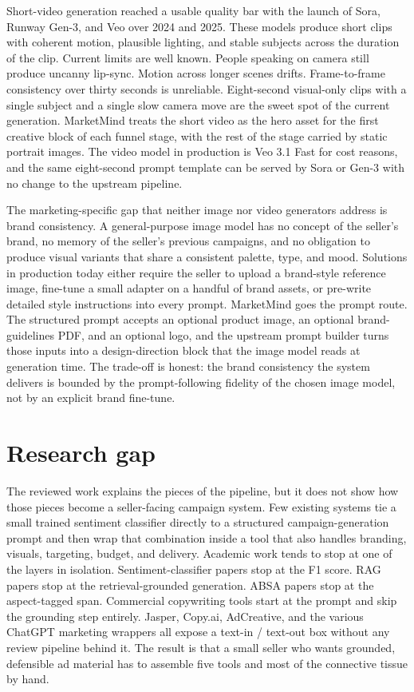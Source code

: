 \documentclass[12pt,a4paper]{report}
\begin{document}
Short-video generation reached a usable quality bar with the launch of Sora, Runway Gen-3, and Veo over 2024 and 2025. These models produce short clips with coherent motion, plausible lighting, and stable subjects across the duration of the clip. Current limits are well known. People speaking on camera still produce uncanny lip-sync. Motion across longer scenes drifts. Frame-to-frame consistency over thirty seconds is unreliable. Eight-second visual-only clips with a single subject and a single slow camera move are the sweet spot of the current generation. MarketMind treats the short video as the hero asset for the first creative block of each funnel stage, with the rest of the stage carried by static portrait images. The video model in production is Veo 3.1 Fast for cost reasons, and the same eight-second prompt template can be served by Sora or Gen-3 with no change to the upstream pipeline.

The marketing-specific gap that neither image nor video generators address is brand consistency. A general-purpose image model has no concept of the seller's brand, no memory of the seller's previous campaigns, and no obligation to produce visual variants that share a consistent palette, type, and mood. Solutions in production today either require the seller to upload a brand-style reference image, fine-tune a small adapter on a handful of brand assets, or pre-write detailed style instructions into every prompt. MarketMind goes the prompt route. The structured prompt accepts an optional product image, an optional brand-guidelines PDF, and an optional logo, and the upstream prompt builder turns those inputs into a design-direction block that the image model reads at generation time. The trade-off is honest: the brand consistency the system delivers is bounded by the prompt-following fidelity of the chosen image model, not by an explicit brand fine-tune.

\section{Research gap}
\label{sec:gap}

The reviewed work explains the pieces of the pipeline, but it does not show how those pieces become a seller-facing campaign system. Few existing systems tie a small trained sentiment classifier directly to a structured campaign-generation prompt and then wrap that combination inside a tool that also handles branding, visuals, targeting, budget, and delivery. Academic work tends to stop at one of the layers in isolation. Sentiment-classifier papers stop at the F1 score. RAG papers stop at the retrieval-grounded generation. ABSA papers stop at the aspect-tagged span. Commercial copywriting tools start at the prompt and skip the grounding step entirely. Jasper, Copy.ai, AdCreative, and the various ChatGPT marketing wrappers all expose a text-in / text-out box without any review pipeline behind it. The result is that a small seller who wants grounded, defensible ad material has to assemble five tools and most of the connective tissue by hand.
\end{document}
